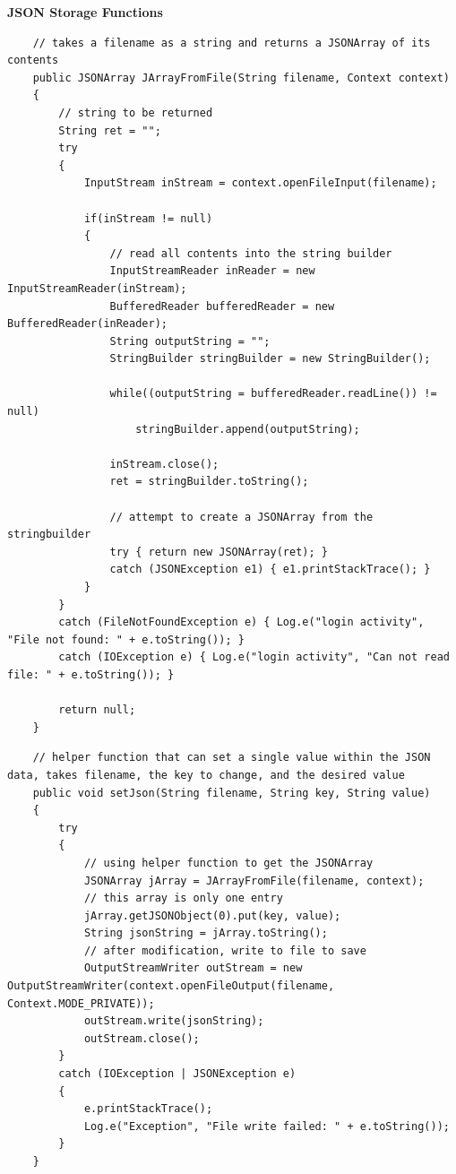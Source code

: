\documentclass[onecolumn, draftclsnofoot,10pt, compsoc, tikz]{IEEEtran}
\begin{document}
\textbf{JSON Storage Functions}
\begin{lstlisting}
    // takes a filename as a string and returns a JSONArray of its contents
    public JSONArray JArrayFromFile(String filename, Context context)
    {
        // string to be returned
        String ret = "";
        try
        {
            InputStream inStream = context.openFileInput(filename);

            if(inStream != null)
            {
                // read all contents into the string builder
                InputStreamReader inReader = new InputStreamReader(inStream);
                BufferedReader bufferedReader = new BufferedReader(inReader);
                String outputString = "";
                StringBuilder stringBuilder = new StringBuilder();

                while((outputString = bufferedReader.readLine()) != null)
                    stringBuilder.append(outputString);

                inStream.close();
                ret = stringBuilder.toString();

                // attempt to create a JSONArray from the stringbuilder
                try { return new JSONArray(ret); }
                catch (JSONException e1) { e1.printStackTrace(); }
            }
        }
        catch (FileNotFoundException e) { Log.e("login activity", "File not found: " + e.toString()); }
        catch (IOException e) { Log.e("login activity", "Can not read file: " + e.toString()); }

        return null;
    }

\end{lstlisting}


\clearpage
\begin{lstlisting}
    // helper function that can set a single value within the JSON data, takes filename, the key to change, and the desired value
    public void setJson(String filename, String key, String value)
    {
        try
        {
            // using helper function to get the JSONArray
            JSONArray jArray = JArrayFromFile(filename, context);
            // this array is only one entry
            jArray.getJSONObject(0).put(key, value);
            String jsonString = jArray.toString();
            // after modification, write to file to save
            OutputStreamWriter outStream = new OutputStreamWriter(context.openFileOutput(filename, Context.MODE_PRIVATE));
            outStream.write(jsonString);
            outStream.close();
        }
        catch (IOException | JSONException e)
        {
            e.printStackTrace();
            Log.e("Exception", "File write failed: " + e.toString());
        }
    }
\end{lstlisting}
\end{document}

